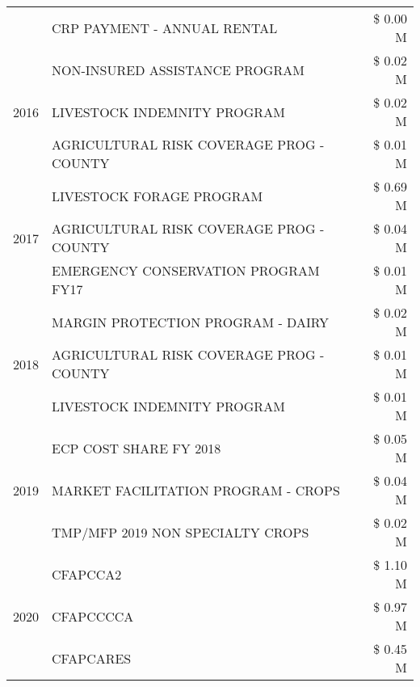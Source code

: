 \begin{tabular}{llr}
 & CRP PAYMENT - ANNUAL RENTAL & \$ 0.00 M \\
\cline{1-3}
\multirow[t]{3}{*}{2016} & NON-INSURED ASSISTANCE PROGRAM & \$ 0.02 M \\
 & LIVESTOCK INDEMNITY PROGRAM & \$ 0.02 M \\
 & AGRICULTURAL RISK COVERAGE PROG - COUNTY & \$ 0.01 M \\
\cline{1-3}
\multirow[t]{3}{*}{2017} & LIVESTOCK FORAGE PROGRAM & \$ 0.69 M \\
 & AGRICULTURAL RISK COVERAGE PROG - COUNTY & \$ 0.04 M \\
 & EMERGENCY CONSERVATION PROGRAM FY17 & \$ 0.01 M \\
\cline{1-3}
\multirow[t]{3}{*}{2018} & MARGIN PROTECTION PROGRAM - DAIRY & \$ 0.02 M \\
 & AGRICULTURAL RISK COVERAGE PROG - COUNTY & \$ 0.01 M \\
 & LIVESTOCK INDEMNITY PROGRAM & \$ 0.01 M \\
\cline{1-3}
\multirow[t]{3}{*}{2019} & ECP COST SHARE FY 2018 & \$ 0.05 M \\
 & MARKET FACILITATION PROGRAM - CROPS & \$ 0.04 M \\
 & TMP/MFP 2019 NON SPECIALTY CROPS & \$ 0.02 M \\
\cline{1-3}
\multirow[t]{3}{*}{2020} & CFAPCCA2 & \$ 1.10 M \\
 & CFAPCCCCA & \$ 0.97 M \\
 & CFAPCARES & \$ 0.45 M \\
\cline{1-3}
\bottomrule
\end{tabular}
